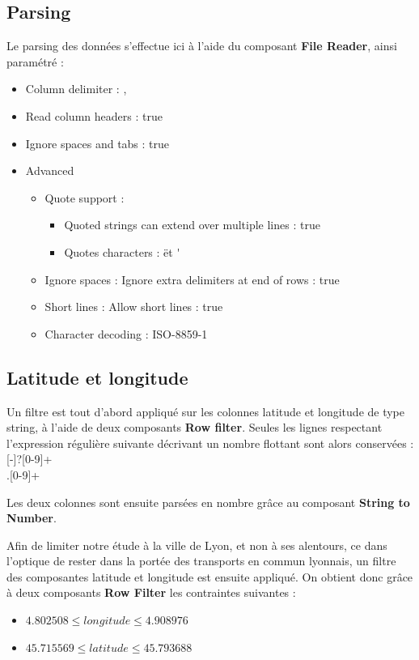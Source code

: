 \subsection{Parsing}
Le parsing des données s'effectue ici à l'aide du composant \textbf{File Reader}, ainsi paramétré :
\begin{itemize}
    \item Column delimiter : ,
    \item Read column headers : true
    \item Ignore spaces and tabs : true
    \item Advanced
    \begin{itemize}
        \item Quote support :
        \begin{itemize}
            \item Quoted strings can extend over multiple lines : true
            \item Quotes characters : \" et \'
        \end{itemize}
        \item Ignore spaces : Ignore extra delimiters at end of rows : true
        \item Short lines : Allow short lines : true
        \item Character decoding : ISO-8859-1
    \end{itemize}
\end{itemize}

\subsection{Latitude et longitude}
Un filtre est tout d'abord appliqué sur les colonnes latitude et longitude de type string, à l'aide de deux composants \textbf{Row filter}. Seules les lignes respectant l'expression régulière suivante décrivant un nombre flottant sont alors conservées : [-]?[0-9]+\\.[0-9]+

Les deux colonnes sont ensuite parsées en nombre grâce au composant \textbf{String to Number}.

Afin de limiter notre étude à la ville de Lyon, et non à ses alentours, ce dans l'optique de rester dans la portée des transports en commun lyonnais, un filtre des composantes latitude et longitude est ensuite appliqué.
On obtient donc grâce à deux composants \textbf{Row Filter} les contraintes suivantes :
\begin{itemize}
    \item $ 4.802508 \leq longitude \leq 4.908976 $
    \item $ 45.715569 \leq latitude \leq 45.793688 $
\end{itemize}

